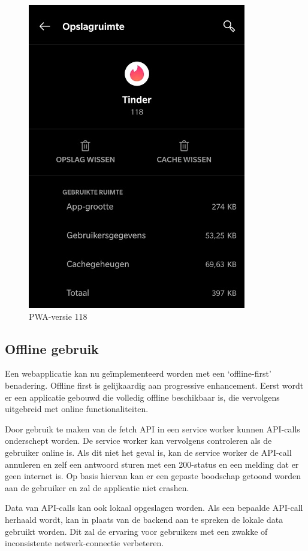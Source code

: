 	\begin{figure}[H]
		\centering
		\includegraphics{./img/tinder_pwa.png}
		\caption{PWA-versie 118}
	\end{figure}

\subsection{Offline gebruik}
	Een webapplicatie kan nu geïmplementeerd worden met een ‘offline-first’ benadering. Offline first is gelijkaardig aan progressive enhancement. Eerst wordt er een applicatie gebouwd die volledig offline beschikbaar is, die vervolgens uitgebreid met online functionaliteiten. 
	
	Door gebruik te maken van de fetch API in een service worker kunnen API-calls onderschept worden. De service worker kan vervolgens controleren als de gebruiker online is. Als dit niet het geval is, kan de service worker de API-call annuleren en zelf een antwoord sturen met een 200-status en een melding dat er geen internet is. Op basis hiervan kan er een gepaste boodschap getoond worden aan de gebruiker en zal de applicatie niet crashen.
	\autocite{Developers2019a}
	
	Data van API-calls kan ook lokaal opgeslagen worden. Als een bepaalde API-call herhaald wordt, kan in plaats van de backend aan te spreken de lokale data gebruikt worden. Dit zal de ervaring voor gebruikers met een zwakke of inconsistente netwerk-connectie verbeteren.
	\autocite{Vanhala2017}
	
